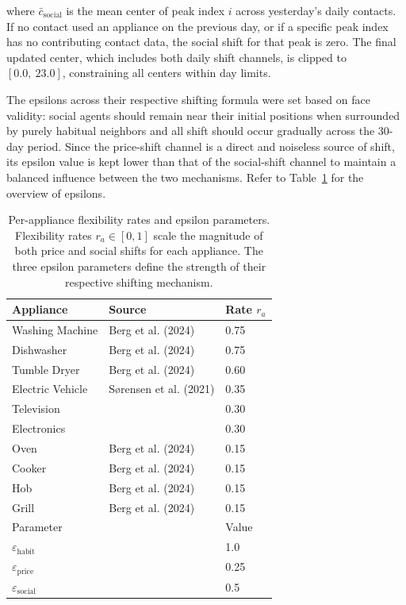 \documentclass[11pt, a4paper]{article}
\begin{document}
\noindent where $\bar{c}_{\text{social}}$ is the mean center of peak index $i$ across yesterday's daily contacts. If no contact used an appliance on the previous day, or if a specific peak index has no contributing contact data, the social shift for that peak is zero. The final updated center, which includes both daily shift channels, is clipped to $[0.0,\ 23.0]$, constraining all centers within day limits. 

The epsilons across their respective shifting formula were set based on face validity: social agents should remain near their initial positions when surrounded by purely habitual neighbors and all shift should occur gradually across the 30-day  period. Since the price-shift channel is a direct and noiseless source of shift, its epsilon value is kept lower than that of the social-shift channel to maintain a balanced influence between the two mechanisms. Refer to Table~\ref{tab:shift_params} for the overview of epsilons.

\begin{table}
    \caption{Per-appliance flexibility rates and epsilon parameters. Flexibility rates $r_a \in [0,1]$ scale the magnitude of both price and social shifts for each appliance. The three epsilon parameters define the strength of their respective shifting mechanism.}
    \label{tab:shift_params}
    \centering
    \small
    \begin{tabular}{lll}
        \toprule
        Appliance         & Source                        & Rate $r_a$ \\
        \midrule
        Washing Machine   & Berg et al. (2024)           & 0.75 \\
        Dishwasher        & Berg et al. (2024)           & 0.75 \\
        Tumble Dryer      & Berg et al. (2024)           & 0.60 \\
        Electric Vehicle  & Sørensen et al. (2021)       & 0.35 \\
        Television        &                              & 0.30 \\
        Electronics       &                              & 0.30 \\
        Oven              & Berg et al. (2024)           & 0.15 \\
        Cooker            & Berg et al. (2024)           & 0.15 \\
        Hob               & Berg et al. (2024)           & 0.15 \\
        Grill             & Berg et al. (2024)           & 0.15 \\
        \midrule
        Parameter                         &                & Value \\
        \midrule
        $\varepsilon_{\text{habit}}$      &                & 1.0  \\
        $\varepsilon_{\text{price}}$      &                & 0.25 \\
        $\varepsilon_{\text{social}}$     &                & 0.5  \\
        \bottomrule
    \end{tabular}
\end{table}
\end{document}
